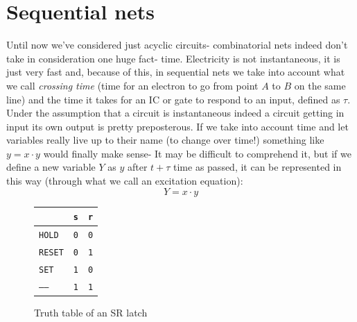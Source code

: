 \documentclass{scrartcl}
\newcommand{\zero}{\texttt{0}}
\newcommand{\one}{\texttt{1}}
\begin{document}
    \section{Sequential nets}
    Until now we've considered just acyclic circuits- combinatorial nets indeed don't take in consideration one huge fact- time. Electricity is not instantaneous, it is just very fast and, because of this, in sequential nets we take into account what we call \emph{crossing time} (time for an electron to go from point $A$ to $B$ on the same line) and the time it takes for an IC or gate to respond to an input, defined as $\tau$.
    Under the assumption that a circuit is instantaneous indeed a circuit getting in input its own output is pretty preposterous.
    If we take into account time and let variables really live up to their name (to change over time!) something like $y = x \cdot y$ would finally make sense- It may be difficult to comprehend it, but if we define a new variable $Y$ as $y$ after $t+\tau$ time as passed, it can be represented in this way (through what we call an excitation equation):
    \begin{equation*}
        Y= x\cdot y
    \end{equation*}
    \begin{figure}
        \centering
        \begin{tabular}{| l | c | c |}
            \hline
            & \texttt{s} & \texttt{r} \\\hline
            \texttt{HOLD} & \zero & \zero\\
            \texttt{RESET} & \zero & \one\\
            \texttt{SET} & \one & \zero\\
            \texttt{-----} & \one & \one\\\hline
        \end{tabular}
        \caption{Truth table of an SR latch}
    \end{figure}
    \vspace{-1cm}
\end{document}
